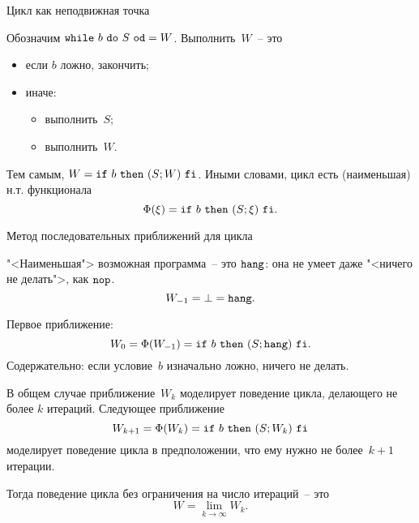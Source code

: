 \documentclass[landscape]{slides}
\begin{document}
\begin{slide}
        Цикл как неподвижная точка

        Обозначим $\mathtt{while}\ {b}\ \mathtt{do}\ {S}\ \mathtt{od} = W$. Выполнить~$W$~-- это
        \begin{itemize}
                \item если $b$ ложно, закончить;
                \item иначе:
                        \begin{itemize}
                                \item выполнить~$S$;
                                \item выполнить~$W$.
                        \end{itemize}
        \end{itemize}

        Тем самым, $W = \mathtt{if}\ {b}\ \mathtt{then}\ {(S ; W)}\ \mathtt{fi}$. Иными словами, цикл есть (наименьшая) н.т. функционала
        \[
                \Phi(\xi) = \mathtt{if}\ {b}\ \mathtt{then}\ {(S ; \xi)}\ \mathtt{fi} .
        \]
\end{slide}

\begin{slide}
        Метод последовательных приближений для цикла

        "<Наименьшая"> возможная программа~-- это $\mathtt{hang}$: она не умеет даже "<ничего не делать">, как $\mathtt{nop}$.
        \[
                W_{-1} = \bot = \mathtt{hang} .
        \]

        Первое приближение:
        \[
                W_0 = \Phi(W_{-1}) = \mathtt{if}\ {b}\ \mathtt{then}\ {(S ; \mathtt{hang})}\ \mathtt{fi} .
        \]
        Содержательно: если условие~$b$ изначально ложно, ничего не делать.

        В общем случае приближение~$W_k$ моделирует поведение цикла, делающего не более $k$ итераций. Следующее приближение
        \[
                W_{k+1} = \Phi(W_k) = \mathtt{if}\ {b}\ \mathtt{then}\ {(S ; W_k)}\ \mathtt{fi}
        \]
        моделирует поведение цикла в предположении, что ему нужно не более~$k+1$ итерации.

        Тогда поведение цикла без ограничения на число итераций~-- это
        \[
                W = \lim_{k \to \infty} W_k .
        \]
\end{slide}
\end{document}
